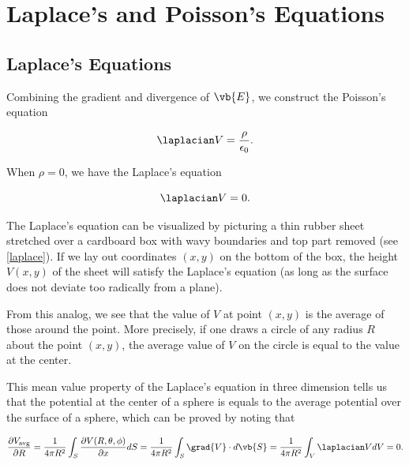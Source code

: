 \documentclass[english,a4paper,12pt]{report}
\begin{document}
\chapter{Laplace's and Poisson's Equations}

\section{Laplace's Equations} \label{lapeq} 


Combining the gradient and divergence of \(\vb{E} \), we construct the Poisson's equation

\begin{equation}
    \laplacian V = \frac{\rho }{\epsilon _0}. 
\end{equation}

When \(\rho = 0\), we have the Laplace's equation

\begin{equation}
    \laplacian V = 0.
\end{equation}

The Laplace's equation can be visualized by picturing a thin rubber sheet stretched over a cardboard box with wavy boundaries and top part removed (see \cref{laplace}). If we lay out coordinates \((x,y)\) on the bottom of the box, the height \(V(x,y)\) of the sheet will satisfy the Laplace's equation (as long as the surface does not deviate too radically from a plane). 

	
From this analog, we see that the value of \(V\) at point \((x,y)\) is the average of those around the point. More precisely, if one draws a circle of any radius \(R\) about the point \((x,y)\), the average value of \(V\) on the circle is equal to the value at the center. 

This mean value property of the Laplace's equation in three dimension tells us that the potential at the center of a sphere is equals to the average potential over the surface of a sphere, which can be proved by noting that 

\begin{equation}
    \frac{\partial V_{\text{avg} } }{\partial R} = \frac{1}{4\pi R^2} \int_{S}^{} \frac{\partial V(R,\theta ,\phi )}{\partial x} dS = \frac{1}{4\pi R^2} \int_{S}^{} \grad{V} \cdot d\vb{S} = \frac{1}{4\pi R^2} \int_{V}^{} \laplacian V dV = 0.     
\end{equation}
\end{document}
